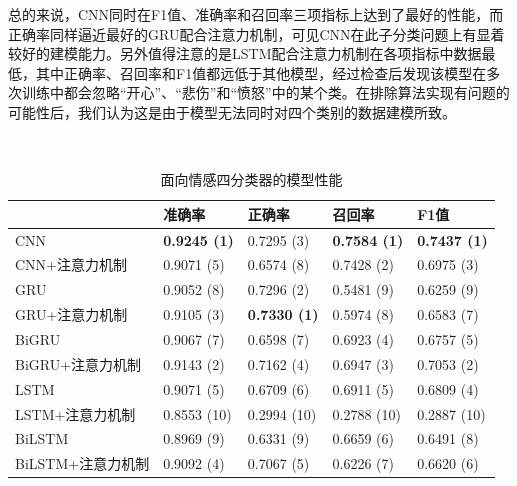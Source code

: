 总的来说，CNN同时在F1值、准确率和召回率三项指标上达到了最好的性能，而正确率同样逼近最好的GRU配合注意力机制，可见CNN在此子分类问题上有显着较好的建模能力。另外值得注意的是LSTM配合注意力机制在各项指标中数据最低，其中正确率、召回率和F1值都远低于其他模型，经过检查后发现该模型在多次训练中都会忽略“开心”、“悲伤”和“愤怒”中的某个类。在排除算法实现有问题的可能性后，我们认为这是由于模型无法同时对四个类别的数据建模所致。

\begin{table}[htb]
  \centering
  \begin{minipage}[t]{\linewidth}
  \caption{面向情感四分类器的模型性能}　
  \label{tab:exp_context_emo_0_result}
    \begin{tabularx}{\linewidth}{X|llll}
    \toprule[1.5pt]
    & 准确率 & 正确率 & 召回率 & F1值 \\
    \hline
    CNN & \bf 0.9245 (1) & 0.7295 (3) & \bf 0.7584 (1) & \bf 0.7437 (1) \\ %
    CNN+注意力机制 & 0.9071 (5) & 0.6574 (8) & 0.7428 (2) & 0.6975 (3) \\ %
    \hline
    GRU & 0.9052 (8) & 0.7296 (2) & 0.5481 (9) & 0.6259 (9) \\ %
    GRU+注意力机制 & 0.9105 (3) & \bf 0.7330 (1) & 0.5974 (8) & 0.6583 (7) \\ %
    \hline
    BiGRU & 0.9067 (7) & 0.6598 (7) & 0.6923 (4) & 0.6757 (5) \\ %
    BiGRU+注意力机制 & 0.9143 (2) & 0.7162 (4) & 0.6947 (3) & 0.7053 (2) \\ %
    \hline
    LSTM & 0.9071 (5) & 0.6709 (6) & 0.6911 (5) & 0.6809 (4) \\ %
    LSTM+注意力机制 & 0.8553 (10) & 0.2994 (10) & 0.2788 (10) & 0.2887 (10) \\ %
    \hline
    BiLSTM & 0.8969 (9) & 0.6331 (9) & 0.6659 (6) & 0.6491 (8) \\ %
    BiLSTM+注意力机制 & 0.9092 (4) & 0.7067 (5) & 0.6226 (7) & 0.6620 (6) \\ %
    \bottomrule[1.5pt]
    \end{tabularx}
  \end{minipage}
\end{table}

